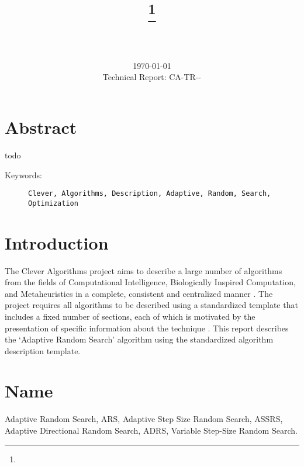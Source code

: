 \documentclass[a4paper, 11pt]{article}
\title{{\myreporttitle}\footnote{\myreportlicense}}
\author{\myreportauthor\\{\myreportemail}\\\small\myreportproject}
\date{\today\\{\small{Technical Report: CA-TR-{\myreportdate}-\myreportversion}}}
\begin{document}
\maketitle

\section*{Abstract} 
todo

\begin{description}
	\item[Keywords:] {\small\texttt{Clever, Algorithms, Description, Adaptive, Random, Search, Optimization}}
\end{description} 

\section{Introduction} 
\label{sec:intro}
The Clever Algorithms project aims to describe a large number of algorithms from the fields of Computational Intelligence, Biologically Inspired Computation, and Metaheuristics in a complete, consistent and centralized manner \cite{Brownlee2010}.
The project requires all algorithms to be described using a standardized template that includes a fixed number of sections, each of which is motivated by the presentation of specific information about the technique \cite{Brownlee2010a}.
This report describes the `Adaptive Random Search' algorithm using the standardized algorithm description template. 

\section{Name} 
\label{sec:name}
Adaptive Random Search, ARS, Adaptive Step Size Random Search, ASSRS, Adaptive Directional Random Search, ADRS, Variable Step-Size Random Search.

\end{document}
